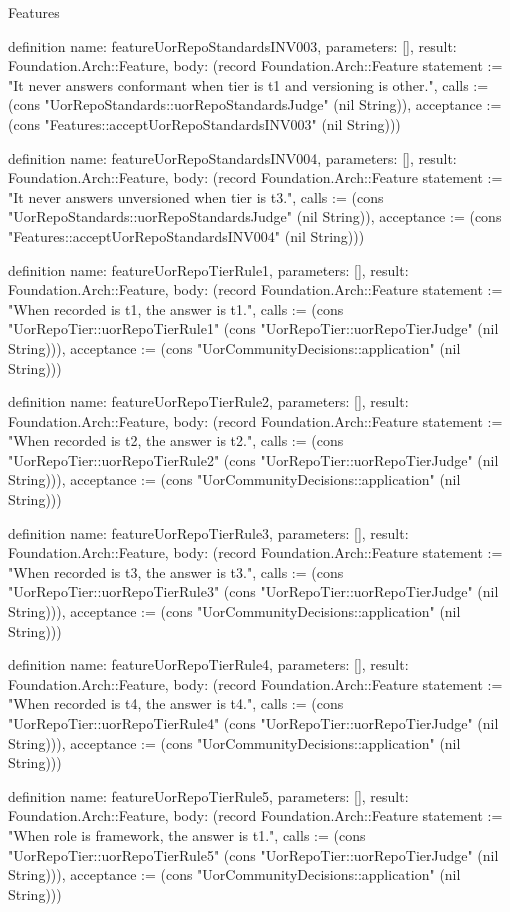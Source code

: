 \begin{lexlean}{Features}
\begin{semanticmodule}
definition{
  name: featureUorRepoStandardsINV003,
  parameters: [],
  result: Foundation.Arch::Feature,
  body: (record Foundation.Arch::Feature {statement := "It never answers conformant when tier is t1 and versioning is other.", calls := (cons "UorRepoStandards::uorRepoStandardsJudge" (nil String)), acceptance := (cons "Features::acceptUorRepoStandardsINV003" (nil String))})
}

definition{
  name: featureUorRepoStandardsINV004,
  parameters: [],
  result: Foundation.Arch::Feature,
  body: (record Foundation.Arch::Feature {statement := "It never answers unversioned when tier is t3.", calls := (cons "UorRepoStandards::uorRepoStandardsJudge" (nil String)), acceptance := (cons "Features::acceptUorRepoStandardsINV004" (nil String))})
}

definition{
  name: featureUorRepoTierRule1,
  parameters: [],
  result: Foundation.Arch::Feature,
  body: (record Foundation.Arch::Feature {statement := "When recorded is t1, the answer is t1.", calls := (cons "UorRepoTier::uorRepoTierRule1" (cons "UorRepoTier::uorRepoTierJudge" (nil String))), acceptance := (cons "UorCommunityDecisions::application" (nil String))})
}

definition{
  name: featureUorRepoTierRule2,
  parameters: [],
  result: Foundation.Arch::Feature,
  body: (record Foundation.Arch::Feature {statement := "When recorded is t2, the answer is t2.", calls := (cons "UorRepoTier::uorRepoTierRule2" (cons "UorRepoTier::uorRepoTierJudge" (nil String))), acceptance := (cons "UorCommunityDecisions::application" (nil String))})
}

definition{
  name: featureUorRepoTierRule3,
  parameters: [],
  result: Foundation.Arch::Feature,
  body: (record Foundation.Arch::Feature {statement := "When recorded is t3, the answer is t3.", calls := (cons "UorRepoTier::uorRepoTierRule3" (cons "UorRepoTier::uorRepoTierJudge" (nil String))), acceptance := (cons "UorCommunityDecisions::application" (nil String))})
}

definition{
  name: featureUorRepoTierRule4,
  parameters: [],
  result: Foundation.Arch::Feature,
  body: (record Foundation.Arch::Feature {statement := "When recorded is t4, the answer is t4.", calls := (cons "UorRepoTier::uorRepoTierRule4" (cons "UorRepoTier::uorRepoTierJudge" (nil String))), acceptance := (cons "UorCommunityDecisions::application" (nil String))})
}

definition{
  name: featureUorRepoTierRule5,
  parameters: [],
  result: Foundation.Arch::Feature,
  body: (record Foundation.Arch::Feature {statement := "When role is framework, the answer is t1.", calls := (cons "UorRepoTier::uorRepoTierRule5" (cons "UorRepoTier::uorRepoTierJudge" (nil String))), acceptance := (cons "UorCommunityDecisions::application" (nil String))})
}


\end{semanticmodule}
\end{lexlean}
